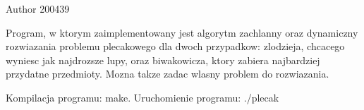 \begin{DoxyAuthor}{\-Author}
200439
\end{DoxyAuthor}
\-Program, w ktorym zaimplementowany jest algorytm zachlanny oraz dynamiczny rozwiazania problemu plecakowego dla dwoch przypadkow\-: zlodzieja, chcacego wyniesc jak najdrozsze lupy, oraz biwakowicza, ktory zabiera najbardziej przydatne przedmioty. \-Mozna takze zadac wlasny problem do rozwiazania.

\-Kompilacja programu\-: make. \-Uruchomienie programu\-: ./plecak 